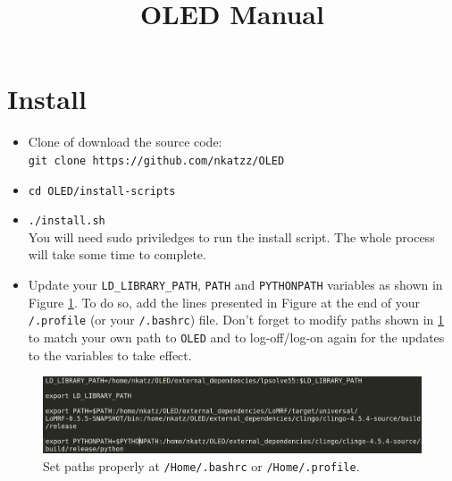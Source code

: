 \documentclass[12pt]{article}
\title{OLED Manual}
\begin{document}
\maketitle

\section{Install}

\begin{itemize}
\item Clone of download the source code: \\ 
\texttt{git clone https://github.com/nkatzz/OLED} 
\item \texttt{cd OLED/install-scripts}
\item \texttt{./install.sh}\\
You will need sudo priviledges to run the install script. The whole process will take some time to complete.

\item Update your \texttt{LD\_LIBRARY\_PATH}, \texttt{PATH} and \texttt{PYTHONPATH} variables as shown in Figure \ref{fig:install}. To do so, add the lines presented in Figure at the end of your  \texttt{\texttildelow/.profile} (or your \texttt{\texttildelow/.bashrc}) file. Don't forget to modify paths shown in \ref{fig:install} to match your own path to \texttt{OLED} and to log-off/log-on again for the updates to the variables to take effect.

\end{itemize}





 



\begin{figure}[t]
\centering
\includegraphics[width=1\textwidth]{./figures/paths}
\caption{Set paths properly at \texttt{/Home/.bashrc} or \texttt{/Home/.profile}.}%
\label{fig:install}
\end{figure}
\end{document}
